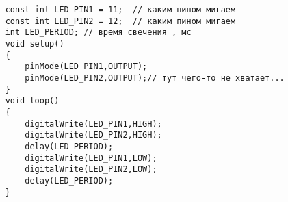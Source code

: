 \codeExample

\begin{verbatim}
    const int LED_PIN1 = 11;  // каким пином мигаем
    const int LED_PIN2 = 12;  // каким пином мигаем
    int LED_PERIOD; // время свечения , мс
    void setup()
    {
        pinMode(LED_PIN1,OUTPUT);
        pinMode(LED_PIN2,OUTPUT);// тут чего-то не хватает...    
    }
    void loop()
    {
        digitalWrite(LED_PIN1,HIGH);
        digitalWrite(LED_PIN2,HIGH);
        delay(LED_PERIOD);
        digitalWrite(LED_PIN1,LOW);
        digitalWrite(LED_PIN2,LOW);
        delay(LED_PERIOD);  
    }
\end{verbatim}